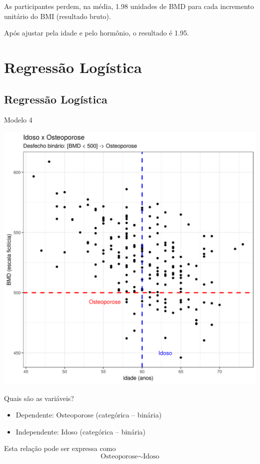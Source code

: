 \documentclass{beamer}
\begin{document}
\begin{frame}{\scriptsize }
  \begin{block}{}
    \footnotesize
    As participantes perdem, na média, 1.98 unidades de BMD para cada incremento unitário do BMI (resultado bruto).

    \bigskip
    Após ajustar pela idade e pelo hormônio, o resultado é 1.95.
  \end{block}
\end{frame}

\section{Regressão Logística}

\subsection{Regressão Logística}

\begin{frame}{\scriptsize Modelo 4}
  \begin{center}
    \includegraphics[height=.9\textheight]{Cap31-32/pratica-glm4}
  \end{center}
\end{frame}

\begin{frame}{\scriptsize Quais são as variáveis?}
  \begin{itemize}
  \item \alert{Dependente: Osteoporose (categórica -- binária)}
  \item Independente: Idoso (categórica -- binária)
  \end{itemize}
  \vfill
  \begin{block}{Esta relação pode ser expressa como}
    \footnotesize
    \begin{displaymath}
      \text{Osteoporose} \sim \text{Idoso}
    \end{displaymath}
  \end{block}
\end{frame}
\end{document}
